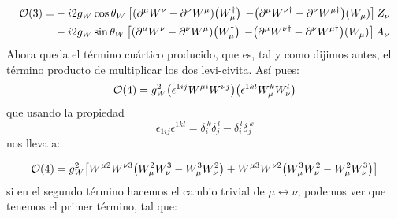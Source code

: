 \begin{itemize}
	\begin{align}
		\Ocal(3)  = &  - {i2 g_W \cos \theta_W}\left[ \pqty{\partial^\mu W^{\nu } - \partial^\nu W^{\mu }}\pqty{ W^\dagger_\mu } \nonumber  \right. 
		\left. - \pqty{\partial^\mu W^{\nu \dagger } - \partial^\nu W^{\mu \dagger}}\pqty{ W_\mu } \right] Z_\nu \nonumber \\ & - 
		 {i2 g_W\sin \theta_W}\left[ \pqty{\partial^\mu W^{\nu } - \partial^\nu W^{\mu }}\pqty{ W^\dagger_\mu } \nonumber  \right. 
		 \left. - \pqty{\partial^\mu W^{\nu \dagger } - \partial^\nu W^{\mu \dagger}}\pqty{ W_\mu} \right] A_\nu  \label{Ec:ej10-03}
	\end{align}
	Ahora queda el término cuártico producido, que es, tal y como dijimos antes, el término producto de multiplicar los dos levi-civita. Así pues: 
	\begin{equation}
		\Ocal(4) = g_W^2 \pqty{\epsilon^{1ij} W^{\mu i} W^{\nu j}}\pqty{\epsilon^{1kl} W^k_\mu W^l_\nu} 
	\end{equation}
	que usando la propiedad 
	\begin{equation}
		\epsilon_{1ij} \epsilon^{1kl}
		= \delta_i^{\,k} \delta_j^{\,l}
		- \delta_i^{\,l} \delta_j^{\,k}
	\end{equation}
	nos lleva a: 

	\begin{equation}
		\Ocal(4) = g_W^2 \bqty{W^{\mu  2} W^{\nu 3} \pqty{W_{\mu}^2 W_{\nu}^3-W_{\mu}^3 W_{\nu}^2}+W^{\mu  3} W^{\nu 2} \pqty{W_{\mu}^3 W_{\nu}^2-W_{\mu}^2 W_{\nu}^3} }
	\end{equation}
	si en el segundo término hacemos el cambio trivial de $\mu \leftrightarrow \nu$, podemos ver que tenemos el primer término, tal que: 
	

\end{itemize}
